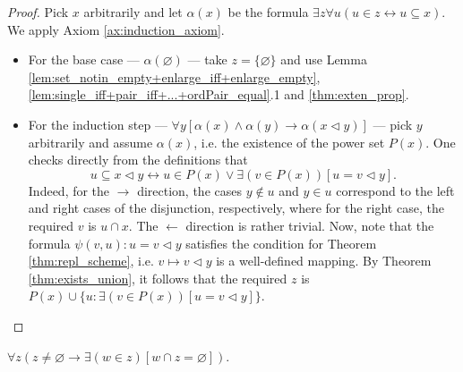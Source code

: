\begin{proof}
    \leanok
    Pick $x$ arbitrarily and let $\alpha (x)$ be the formula $\exists z \forall u (u\in z \leftrightarrow u \subseteq x)$.
    We apply Axiom \ref{ax:induction_axiom}.
    \begin{itemize}
        \item For the base case — $\alpha (\varnothing)$ — take $z=\{\varnothing\}$ and use Lemma \ref{lem:set_notin_empty+enlarge_iff+enlarge_empty}, \ref{lem:single_iff+pair_iff+...+ordPair_equal}.1 
        and \ref{thm:exten_prop}.
        \item For the induction step — $\forall y[\alpha(x) \land \alpha(y) \rightarrow \alpha(x \lhd y)]$ — 
        pick $y$ arbitrarily and assume $\alpha(x)$, i.e. the existence of the power set $P(x)$.
        One checks directly from the definitions that $$u \subseteq x \lhd y \leftrightarrow u \in P(x) \lor \exists (v \in P(x))[u=v\lhd y]. $$
        Indeed, for the $\rightarrow$ direction, the cases $y \notin u$ and $y \in u$ correspond to the left and right cases of the disjunction, 
        respectively, where for the right case, the required $v$ is $u \cap x$. The $\leftarrow$ direction is rather trivial.
        Now, note that the formula $\psi(v,u): u = v \lhd y$ satisfies the condition for Theorem \ref{thm:repl_scheme}, i.e. $v \mapsto v \lhd y$ is a well-defined mapping.
        By Theorem \ref{thm:exists_union}, it follows that the required $z$ is $P(x) \cup \{u : \exists (v \in P(x)) [u=v\lhd y]\}$.
    \end{itemize}
\end{proof}

\begin{theorem}
    \label{thm:found_prop}
    \leanok
    $\forall z (z\neq \varnothing \rightarrow \exists (w \in z)[w\cap z = \varnothing])$.
\end{theorem}

